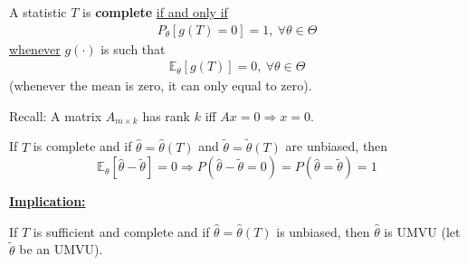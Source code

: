 \documentclass[11pt]{elegantbook}
\begin{document}
\begin{definition}
    \normalfont
    A statistic $T$ is \textbf{complete} \underline{if and only if}
    \begin{equation}
        \begin{aligned}
            P_\theta[g(T)=0]=1, \ \forall \theta\in \Theta
        \end{aligned}
        \nonumber
    \end{equation}
    \underline{whenever} $g(\cdot)$ is such that
    \begin{equation}
        \begin{aligned}
            \mathbb{E}_\theta[g(T)]=0,\ \forall \theta\in \Theta
        \end{aligned}
        \nonumber
    \end{equation}
    (whenever the mean is zero, it can only equal to zero).
\end{definition}

Recall: A matrix $A_{m\times k}$ has rank $k$ iff $Ax=0 \Rightarrow x=0$.

\begin{theorem}
    If $T$ is complete and if $\hat{\theta}=\hat{\theta}(T)$ and $\tilde{\theta}=\tilde{\theta}(T)$ are unbiased, then $$\mathbb{E}_\theta[\hat{\theta}-\tilde{\theta}]=0 \Rightarrow P(\hat{\theta}-\tilde{\theta}=0)=P(\hat{\theta}=\tilde{\theta})=1$$
\end{theorem}

\textbf{\underline{Implication:}}
\begin{corollary}
    If $T$ is sufficient and complete and if $\hat{\theta}=\hat{\theta}(T)$ is unbiased, then $\hat{\theta}$ is UMVU (let $\tilde{\theta}$ be an UMVU).
\end{corollary}
\end{document}
